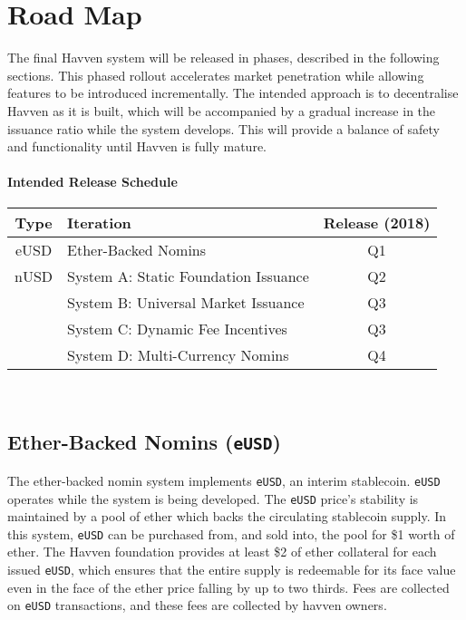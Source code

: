 \section{Road Map}

The final Havven system will be released in phases, described in the following
sections. This phased rollout accelerates market penetration while
allowing features to be introduced incrementally. The intended approach  
is to decentralise Havven as it is built, which will be accompanied by a gradual
increase in the issuance ratio while the system develops.
This will provide a balance of safety and functionality until Havven is fully
mature.

\paragraph{Intended Release Schedule}
\renewcommand{\arraystretch}{1.5}
\setlength{\tabcolsep}{15pt}
\begin{centering}
    \begin{tabular}{|c|l|c|}
        \hline
        \textbf{Type} & \textbf{Iteration} & \textbf{Release (2018)} \\
        \hline
        \hline
        eUSD & Ether-Backed Nomins & Q1 \\
        \hline
        \hline
        nUSD & System A: Static Foundation Issuance & Q2 \\ \cline{2-3}
        & System B: Universal Market Issuance & Q3 \\ \cline{2-3}
        & System C: Dynamic Fee Incentives & Q3 \\ \cline{2-3}
        & System D: Multi-Currency Nomins& Q4 \\
        \hline
    \end{tabular} \\
\end{centering}
\vspace{0.5cm}

\subsection{Ether-Backed Nomins (\texttt{eUSD})}

\noindent The ether-backed nomin system implements \texttt{eUSD}, an interim stablecoin.
\texttt{eUSD} operates while the system is being developed.
The \texttt{eUSD} price's stability is maintained by a pool of ether which
backs the circulating stablecoin supply. In this system, \texttt{eUSD} can be
purchased from, and sold into, the pool for \$1 worth of ether.
The Havven foundation provides at least \$2 of ether collateral for each
issued \texttt{eUSD}, which ensures that the entire supply is redeemable for its
face value even in the face of the ether price falling by up to two thirds.
Fees are collected on \texttt{eUSD} transactions, and these fees are collected
by havven owners. \\

